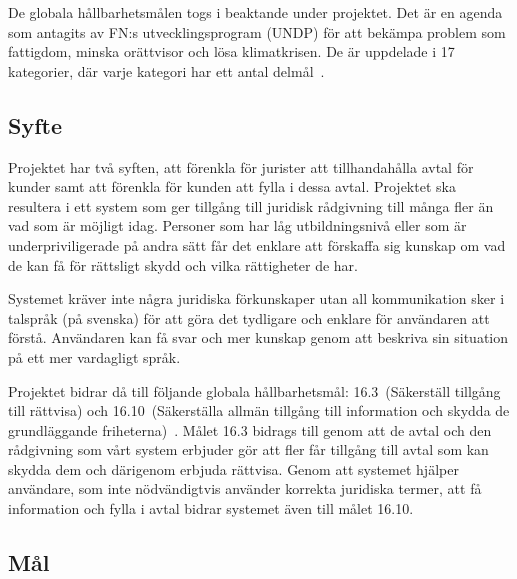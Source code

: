 \documentclass[a4paper,12pt]{article}
\begin{document}
De globala hållbarhetsmålen togs i beaktande under projektet. Det är en agenda som antagits av FN:s utvecklingsprogram (UNDP) för att bekämpa problem som fattigdom, minska orättvisor och lösa klimatkrisen. De är uppdelade i 17 kategorier, där varje kategori har ett antal delmål~\cite{web:globalamalen}.

\subsection{Syfte} %

Projektet har två syften, att förenkla för jurister att tillhandahålla avtal för kunder samt att förenkla för kunden att fylla i dessa avtal. Projektet ska resultera i ett system som ger tillgång till juridisk rådgivning till många fler än vad som är möjligt idag. Personer som har låg utbildningsnivå eller som är underpriviligerade på andra sätt får det enklare att förskaffa sig kunskap om vad de kan få för rättsligt skydd och vilka rättigheter de har. 

Systemet kräver inte några juridiska förkunskaper utan all kommunikation sker i tal\-språk (på svenska) för att göra det tydligare och enklare för användaren att förstå. Användaren kan få svar och mer kunskap genom att beskriva sin situation på ett mer vardagligt språk.

Projektet bidrar då till följande globala hållbarhetsmål:
16.3~(Säkerställ tillgång till rättvisa) och
16.10~(Säkerställa allmän tillgång till information och skydda de grund\-läggande friheterna)~\cite{web:globalamalen-16}. Målet 16.3 bidrags till genom att de avtal och den rådgivning som vårt system erbjuder gör att fler får tillgång till avtal som kan skydda dem och därigenom erbjuda rättvisa. Genom att systemet hjälper användare, som inte nöd\-vän\-digt\-vis använder korrekta juridiska termer, att få information och fylla i avtal bidrar systemet även till målet 16.10.

\subsection{Mål} %

\end{document}
